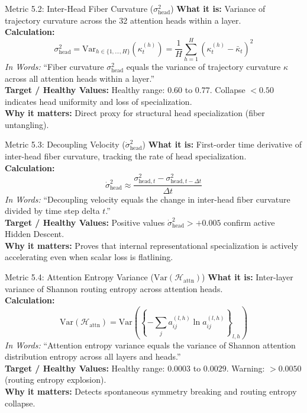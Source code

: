 \documentclass[11pt,a4paper]{article}
\begin{document}
\begin{metricbox}{Metric 5.2: Inter-Head Fiber Curvature ($\sigma^2_{\text{head}}$)}
\textbf{What it is:} Variance of trajectory curvature across the 32 attention heads within a layer.\\
\textbf{Calculation:}
 $$\sigma^2_{\text{head}} = \text{Var}_{h \in \{1, \dots, H\}}\left(\kappa_t^{(h)}\right) = \frac{1}{H} \sum_{h=1}^H \left(\kappa_t^{(h)} - \bar{\kappa}_t\right)^2$$ \emph{In Words:} ``Fiber curvature $\sigma^2_{\text{head}}$ equals the variance of trajectory curvature $\kappa$ across all attention heads within a layer.''\\
\textbf{Target / Healthy Values:} Healthy range: $0.60$ to $0.77$. Collapse $< 0.50$ indicates head uniformity and loss of specialization.\\
\textbf{Why it matters:} Direct proxy for structural head specialization (fiber untangling).
\end{metricbox}

\begin{metricbox}{Metric 5.3: Decoupling Velocity ($\dot{\sigma}^2_{\text{head}}$)}
\textbf{What it is:} First-order time derivative of inter-head fiber curvature, tracking the rate of head specialization.\\
\textbf{Calculation:}
 $$\dot{\sigma}^2_{\text{head}} \approx \frac{\sigma^2_{\text{head}, t} - \sigma^2_{\text{head}, t-\Delta t}}{\Delta t}$$ \emph{In Words:} ``Decoupling velocity equals the change in inter-head fiber curvature divided by time step delta $t$.''\\
\textbf{Target / Healthy Values:} Positive values $\dot{\sigma}^2_{\text{head}} > +0.005$ confirm active Hidden Descent.\\
\textbf{Why it matters:} Proves that internal representational specialization is actively accelerating even when scalar loss is flatlining.
\end{metricbox}

\begin{metricbox}{Metric 5.4: Attention Entropy Variance ($\text{Var}(\mathcal{H}_{\text{attn}})$)}
\textbf{What it is:} Inter-layer variance of Shannon routing entropy across attention heads.\\
\textbf{Calculation:}
 $$\text{Var}(\mathcal{H}_{\text{attn}}) = \text{Var}\left(\left\{-\sum_j a_{ij}^{(l, h)} \ln a_{ij}^{(l, h)}\right\}_{l, h}\right)$$ \emph{In Words:} ``Attention entropy variance equals the variance of Shannon attention distribution entropy across all layers and heads.''\\
\textbf{Target / Healthy Values:} Healthy range: $0.0003$ to $0.0029$. Warning: $> 0.0050$ (routing entropy explosion).\\
\textbf{Why it matters:} Detects spontaneous symmetry breaking and routing entropy collapse.
\end{metricbox}
\end{document}
